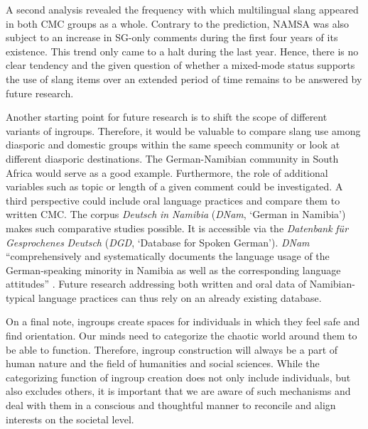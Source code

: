 \documentclass[output=paper]{langsci/langscibook}
\begin{document}
A second analysis revealed the frequency with which multilingual slang appeared in both CMC groups as a whole. Contrary to the prediction, NAMSA was also subject to an increase in SG-only comments during the first four years of its existence. This trend only came to a halt during the last year. Hence, there is no clear tendency and the given question of whether a mixed-mode status supports the use of slang items over an extended period of time remains to be answered by future research. 

Another starting point for future research is to shift the scope of different variants of ingroups. Therefore, it would be valuable to compare slang use among diasporic and domestic groups within the same speech community or look at different diasporic destinations. The German-Namibian community in South Africa would serve as a good example. Furthermore, the role of additional variables such as topic or length of a given comment could be investigated. A third perspective could include oral language practices and compare them to written CMC. The corpus \textit{Deutsch} \textit{in} \textit{Namibia} (\textit{DNam}, ‘German in Namibia’) makes such comparative studies possible. It is accessible via the \textit{Datenbank} \textit{für} \textit{Gesprochenes} \textit{Deutsch} (\textit{DGD}, ‘Database for Spoken German’). \textit{DNam} “comprehensively and systematically documents the language usage of the German-speaking minority in Namibia as well as the corresponding language attitudes” \citep[210]{zimmer_korpus_2020}. Future research addressing both written and oral data of Namibian-typical language practices can thus rely on an already existing database.

On a final note, ingroups create spaces for individuals in which they feel safe and find orientation. Our minds need to categorize the chaotic world around them to be able to function. Therefore, ingroup construction will always be a part of human nature and the field of humanities and social sciences. While the categorizing function of ingroup creation does not only include individuals, but also excludes others, it is important that we are aware of such mechanisms and deal with them in a conscious and thoughtful manner to reconcile and align interests on the societal level.

{\sloppy\printbibliography[heading=subbibliography,notkeyword=this]}
\end{document}
